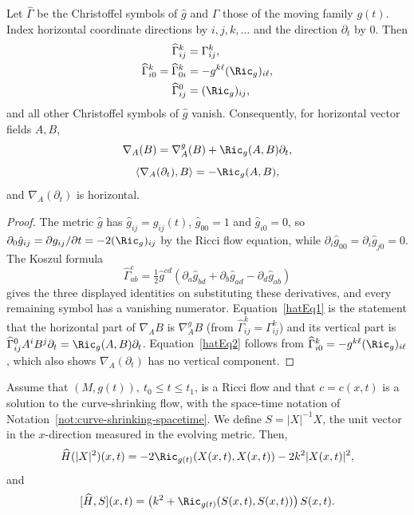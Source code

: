 \begin{lemma}
\label{lem:spacetime-christoffel}
\label{hatchristoffel}
Let $\widehat\Gamma$ be the Christoffel symbols of $\hat g$ and $\Gamma$ those
of the moving family $g(t)$. Index horizontal coordinate directions by
$i,j,k,\dots$ and the direction $\partial_t$ by $0$. Then
\begin{align*}
\widehat \Gamma^k_{ij} & = \Gamma^k_{ij}, \\
\widehat \Gamma^k_{i0} = \widehat \Gamma^k_{0i} & = -g^{k\ell}(\Ric_g)_{i\ell}, \\
\widehat \Gamma^0_{ij} & = (\Ric_g)_{ij},
\end{align*}
and all other Christoffel symbols of $\hat g$ vanish. Consequently, for
horizontal vector fields $A,B$,
\begin{equation}\label{hatEq1}
\nabla_A(B)=\nabla^g_A(B)+\Ric_g(A,B)\partial_t,
\end{equation}
\begin{equation}\label{hatEq2}
\langle \nabla_A(\partial_t),B\rangle=-\Ric_g(A,B),
\end{equation}
and $\nabla_A(\partial_t)$ is horizontal.
\end{lemma}

\begin{proof}
The metric $\hat g$ has $\hat g_{ij}=g_{ij}(t)$, $\hat g_{00}=1$ and
$\hat g_{i0}=0$, so $\partial_0\hat g_{ij}=\partial g_{ij}/\partial t=-2(\Ric_g)_{ij}$
by the Ricci flow equation, while $\partial_i \hat g_{00}=\partial_i\hat g_{j0}=0$.
The Koszul formula
$$\widehat\Gamma^c_{ab}=\tfrac12\hat g^{cd}\left(\partial_a\hat g_{bd}+\partial_b\hat g_{ad}-\partial_d\hat g_{ab}\right)$$
gives the three displayed identities on substituting these derivatives, and
every remaining symbol has a vanishing numerator. Equation~\eqref{hatEq1} is the
statement that the horizontal part of $\nabla_AB$ is $\nabla^g_AB$ (from
$\widehat\Gamma^k_{ij}=\Gamma^k_{ij}$) and its vertical part is
$\widehat\Gamma^0_{ij}A^iB^j\partial_t=\Ric_g(A,B)\partial_t$.
Equation~\eqref{hatEq2} follows from
$\widehat\Gamma^k_{i0}=-g^{k\ell}(\Ric_g)_{i\ell}$, which also shows
$\nabla_A(\partial_t)$ has no vertical component.
\end{proof}

\begin{lemma}
\label{lem:curve-shrinking-first-variation}
\label{1stcurvshr}
Assume that $(M,g(t)),\ t_0\le t\le t_1$, is a Ricci flow and that
$c=c(x,t)$ is a solution to the curve-shrinking flow, with the space-time
notation of Notation~\ref{not:curve-shrinking-spacetime}. We define
$S=|X|^{-1}X$, the unit vector in the $x$-direction measured in the evolving
metric. Then,
$$\widehat H(|X|^2)(x,t)=-2\Ric_{g(t)}(X(x,t),X(x,t))-2k^2|X(x,t)|^2,$$
and
$$[\widehat H,S](x,t)=\left(k^2+\Ric_{g(t)}(S(x,t),S(x,t))\right)S(x,t).$$
\end{lemma}


